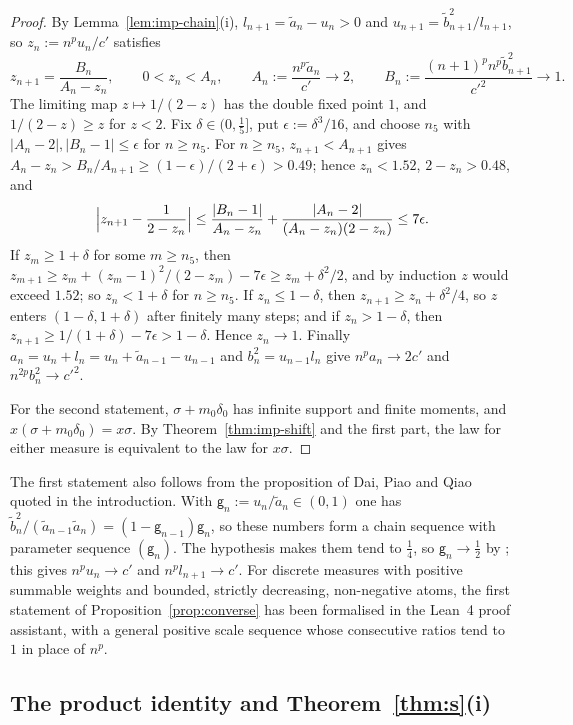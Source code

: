 \begin{proof}
By Lemma~\ref{lem:imp-chain}(i), $l_{n+1}=\tilde a_n-u_n>0$ and $u_{n+1}=\tilde b_{n+1}^2/l_{n+1}$, so
$z_n:=n^pu_n/c'$ satisfies
\[
  z_{n+1}=\frac{B_n}{A_n-z_n},\qquad 0<z_n<A_n,\qquad A_n:=\frac{n^p\tilde a_n}{c'}\to2,\qquad
  B_n:=\frac{(n+1)^pn^p\tilde b_{n+1}^2}{c'^2}\to1 .
\]
The limiting map $z\mapsto1/(2-z)$ has the double fixed point $1$, and $1/(2-z)\ge z$ for $z<2$. Fix
$\delta\in(0,\frac15]$, put $\epsilon:=\delta^3/16$, and choose $n_5$ with $|A_n-2|,|B_n-1|\le\epsilon$ for $n\ge n_5$.
For $n\ge n_5$, $z_{n+1}<A_{n+1}$ gives $A_n-z_n>B_n/A_{n+1}\ge(1-\epsilon)/(2+\epsilon)>0.49$; hence $z_n<1.52$,
$2-z_n>0.48$, and
\[
  \Bigl|z_{n+1}-\frac1{2-z_n}\Bigr|\le\frac{|B_n-1|}{A_n-z_n}+\frac{|A_n-2|}{(A_n-z_n)(2-z_n)}\le7\epsilon .
\]
If $z_m\ge1+\delta$ for some $m\ge n_5$, then $z_{m+1}\ge z_m+(z_m-1)^2/(2-z_m)-7\epsilon\ge z_m+\delta^2/2$, and by
induction $z$ would exceed $1.52$; so $z_n<1+\delta$ for $n\ge n_5$. If $z_n\le1-\delta$, then
$z_{n+1}\ge z_n+\delta^2/4$, so $z$ enters $(1-\delta,1+\delta)$ after finitely many steps; and if $z_n>1-\delta$, then
$z_{n+1}\ge1/(1+\delta)-7\epsilon>1-\delta$. Hence $z_n\to1$. Finally $a_n=u_n+l_n=u_n+\tilde a_{n-1}-u_{n-1}$ and
$b_n^2=u_{n-1}l_n$ give $n^pa_n\to2c'$ and $n^{2p}b_n^2\to c'^2$.

For the second statement, $\sigma+m_0\delta_0$ has infinite support and finite moments, and
$x(\sigma+m_0\delta_0)=x\sigma$. By Theorem~\ref{thm:imp-shift} and the first part, the law for either measure is
equivalent to the law for $x\sigma$.
\end{proof}

The first statement also follows from the proposition of Dai, Piao and Qiao quoted in the introduction. With
$\mathsf g_n:=u_n/\tilde a_n\in(0,1)$ one has $\tilde b_n^2/(\tilde a_{n-1}\tilde a_n)=(1-\mathsf g_{n-1})\mathsf g_n$, so
these numbers form a chain sequence with parameter sequence $(\mathsf g_n)$. The hypothesis makes them tend to
$\frac14$, so $\mathsf g_n\to\frac12$ by \cite[Proposition~2.1]{DPQ}; this gives $n^pu_n\to c'$ and $n^pl_{n+1}\to c'$. For
discrete measures with positive summable weights and bounded, strictly decreasing, non-negative atoms, the first
statement of Proposition~\ref{prop:converse} has been formalised in the Lean~4 proof assistant, with a general positive
scale sequence whose consecutive ratios tend to $1$ in place of $n^p$.

\subsection{The product identity and Theorem~\ref{thm:s}(i)}

